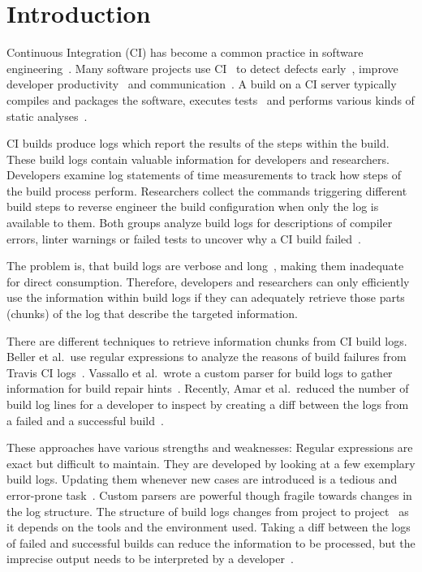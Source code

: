 \documentclass[\myrootdir/main.tex]{subfiles}
\begin{document}
\chapter{Introduction}
Continuous Integration (CI) has become a common practice in software engineering~\cite{hilton2016usage}.
Many software projects use CI~\cite{hilton2016usage,staahl2014modeling,beller2017oops} to detect defects early~\cite{vasilescu2015quality,duvall2007continuous}, improve developer productivity~\cite{miller2008hundred,hilton2016usage} and communication~\cite{downs2012ambient}.
A build on a CI server typically compiles and packages the software, executes tests~\cite{beller2017oops} and performs various kinds of static analyses~\cite{zampetti2017open}.

CI builds produce logs which report the results of the steps within the build.
These build logs contain valuable information for developers and researchers.
Developers examine log statements of time measurements to track how steps of the build process perform.
Researchers collect the commands triggering different build steps to reverse engineer the build configuration when only the log is available to them.
Both groups analyze build logs for descriptions of compiler errors, linter warnings or failed tests to uncover why a CI build failed~\cite{beller2017oops,seo2014programmers,vassallo2017a-tale}.

The problem is, that build logs are verbose and long~\cite{beller2017oops}, making them inadequate for direct consumption.
Therefore, developers and researchers can only efficiently use the information within build logs if they can adequately retrieve those parts (chunks) of the log that describe the targeted information.

There are different techniques to retrieve information chunks from CI build logs.
Beller et al.\ use regular expressions to analyze the reasons of build failures from Travis CI logs~\cite{beller2017oops}.
Vassallo et al.\ wrote a custom parser for build logs to gather information for build repair hints~\cite{vassallo2018un-break}.
Recently, Amar et al.\ reduced the number of build log lines for a developer to inspect by creating a diff between the logs from a failed and a successful build~\cite{amar2019mining}.

These approaches have various strengths and weaknesses:
Regular expressions are exact but difficult to maintain.
They are developed by looking at a few exemplary build logs. Updating them whenever new cases are introduced is a tedious and error-prone task~\cite{michael2019regexes}.
Custom parsers are powerful though fragile towards changes in the log structure.
The structure of build logs changes from project to project~\cite{staahl2014modeling} as it depends on the tools and the environment used.
Taking a diff between the logs of failed and successful builds can reduce the information to be processed, but the imprecise output needs to be interpreted by a developer~\cite{amar2019mining}.
\end{document}
